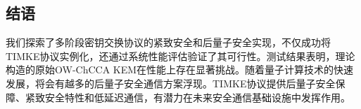 \subsection{结语}

我们探索了多阶段密钥交换协议的紧致安全和后量子安全实现，不仅成功将TIMKE协议实例化，还通过系统性能评估验证了其可行性。测试结果表明，理论构造的原始OW-ChCCA KEM在性能上存在显著挑战。随着量子计算技术的快速发展，将会有越多的后量子安全通信方案浮现。TIMKE协议提供后量子安全保障、紧致安全特性和低延迟通信，有潜力在未来安全通信基础设施中发挥作用。